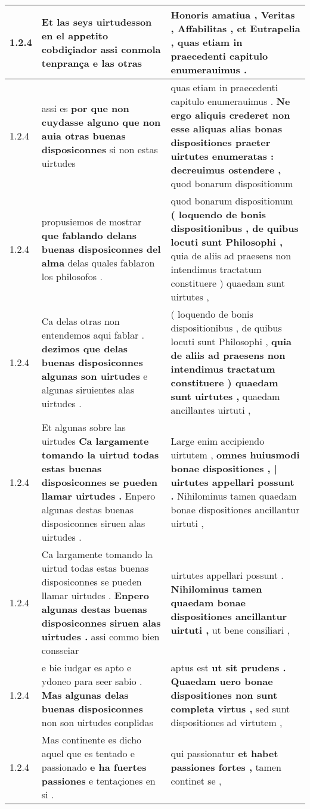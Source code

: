 \begin{tabular}{|p{1cm}|p{6.5cm}|p{6.5cm}|}
1.2.4 & Et las seys uirtudesson en el appetito cobdiçiador \textbf{ assi conmola tenprança } e las otras & Honoris amatiua , Veritas , \textbf{ Affabilitas , et Eutrapelia , } quas etiam in praecedenti capitulo enumerauimus . \\\hline
1.2.4 & assi es \textbf{ por que non cuydasse alguno que non auia otras buenas disposiconnes } si non estas uirtudes & quas etiam in praecedenti capitulo enumerauimus . \textbf{ Ne ergo aliquis crederet non esse aliquas alias bonas dispositiones praeter uirtutes enumeratas : decreuimus ostendere , } quod bonarum dispositionum \\\hline
1.2.4 & propusiemos de mostrar \textbf{ que fablando delans buenas disposiconnes del alma } delas quales fablaron los philosofos . & quod bonarum dispositionum \textbf{ ( loquendo de bonis dispositionibus , de quibus locuti sunt Philosophi , } quia de aliis ad praesens non intendimus tractatum constituere ) quaedam sunt uirtutes , \\\hline
1.2.4 & Ca delas otras non entendemos aqui fablar . \textbf{ dezimos que delas buenas disposiconnes algunas son uirtudes } e algunas siruientes alas uirtudes . & ( loquendo de bonis dispositionibus , de quibus locuti sunt Philosophi , \textbf{ quia de aliis ad praesens non intendimus tractatum constituere ) quaedam sunt uirtutes , } quaedam ancillantes uirtuti , \\\hline
1.2.4 & Et algunas sobre las uirtudes \textbf{ Ca largamente tomando la uirtud todas estas buenas disposiconnes se pueden llamar uirtudes . } Enpero algunas destas buenas disposiconnes siruen alas uirtudes . & Large enim accipiendo uirtutem , \textbf{ omnes huiusmodi bonae dispositiones , | uirtutes appellari possunt . } Nihilominus tamen quaedam bonae dispositiones ancillantur uirtuti , \\\hline
1.2.4 & Ca largamente tomando la uirtud todas estas buenas disposiconnes se pueden llamar uirtudes . \textbf{ Enpero algunas destas buenas disposiconnes siruen alas uirtudes . } assi commo bien consseiar & uirtutes appellari possunt . \textbf{ Nihilominus tamen quaedam bonae dispositiones ancillantur uirtuti , } ut bene consiliari , \\\hline
1.2.4 & e bie iudgar es apto e ydoneo para seer sabio . \textbf{ Mas algunas delas buenas disposiconnes } non son uirtudes conplidas & aptus est \textbf{ ut sit prudens . Quaedam uero bonae dispositiones non sunt completa virtus , } sed sunt dispositiones ad virtutem , \\\hline
1.2.4 & Mas continente es dicho aquel que es tentado e passionado \textbf{ e ha fuertes passiones } e tentaçiones en si . & qui passionatur \textbf{ et habet passiones fortes , } tamen continet se , \\\hline

\end{tabular}
